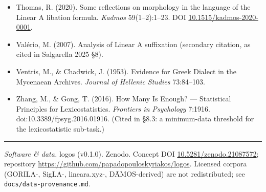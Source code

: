 \documentclass[
  10pt,
]{article}
\begin{document}
\begin{itemize}
  \href{https://doi.org/10.3389/frai.2025.1581129}{10.3389/frai.2025.1581129}.
  Code: github.com/ftamburin/CSA\_OptMatcher.
\item
  Thomas, R. (2020). Some reflections on morphology in the language of
  the Linear A libation formula. \emph{Kadmos} 59(1--2):1--23. DOI
  \href{https://doi.org/10.1515/kadmos-2020-0001}{10.1515/kadmos-2020-0001}.
\item
  Valério, M. (2007). Analysis of Linear A suffixation (secondary
  citation, as cited in Salgarella 2025 §8).
\item
  Ventris, M., \& Chadwick, J. (1953). Evidence for Greek Dialect in the
  Mycenaean Archives. \emph{Journal of Hellenic Studies} 73:84--103.
\item
  Zhang, M., \& Gong, T. (2016). How Many Is Enough? --- Statistical
  Principles for Lexicostatistics. \emph{Frontiers in Psychology}
  7:1916. doi:10.3389/fpsyg.2016.01916. (Cited in §8.3: a minimum-data
  threshold for the lexicostatistic sub-task.)
\end{itemize}

\begin{center}\rule{0.5\linewidth}{0.5pt}\end{center}

\emph{Software \& data.} logos (v0.1.0). Zenodo. Concept DOI
\href{https://doi.org/10.5281/zenodo.21087572}{10.5281/zenodo.21087572};
repository \url{https://github.com/papadopouloskyriakos/logos}. Licensed
corpora (GORILA-, SigLA-, lineara.xyz-, DĀMOS-derived) are not
redistributed; see \texttt{docs/data-provenance.md}.
\end{document}
